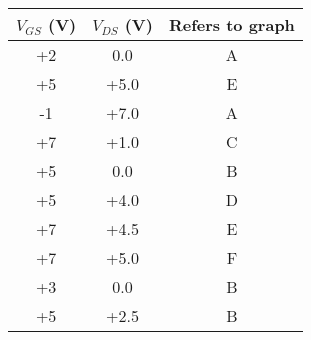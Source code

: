 \begin{tabular}{@{}ccc@{}}
    \toprule
    \textbf{$V_{GS}$ (V)} & \textbf{$V_{DS}$ (V)} & \textbf{Refers to graph} \\ \midrule
    +2                    & 0.0                   & A                         \\
    +5                    & +5.0                  & E                         \\
    -1                    & +7.0                  & A                         \\
    +7                    & +1.0                  & C                         \\
    +5                    & 0.0                   & B                        \\
    +5                    & +4.0                  & D                         \\
    +7                    & +4.5                  & E                         \\
    +7                    & +5.0                  & F                         \\
    +3                    & 0.0                   & B                         \\
    +5                    & +2.5                  & B                         \\ \bottomrule
\end{tabular}